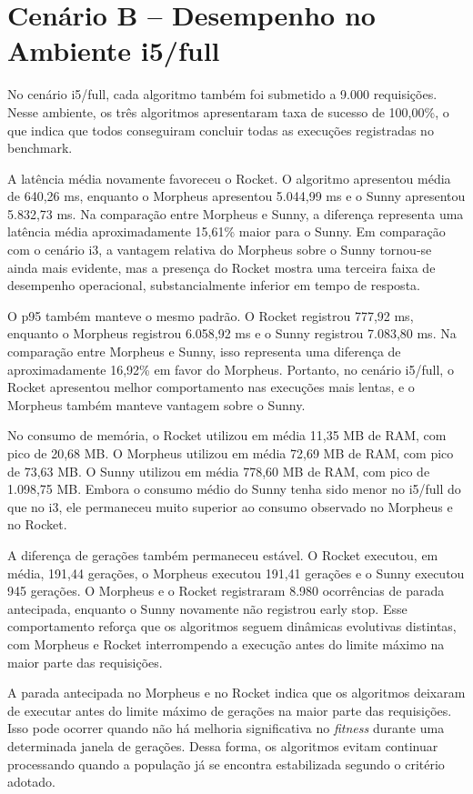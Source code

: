 \section{Cenário B -- Desempenho no Ambiente i5/full}
\label{sec:cenario-b-i5-full}

No cenário i5/full, cada algoritmo também foi submetido a 9.000 requisições. Nesse ambiente, os três algoritmos apresentaram taxa de sucesso de 100,00\%, o que indica que todos conseguiram concluir todas as execuções registradas no benchmark.

A latência média novamente favoreceu o Rocket. O algoritmo apresentou média de 640,26 ms, enquanto o Morpheus apresentou 5.044,99 ms e o Sunny apresentou 5.832,73 ms. Na comparação entre Morpheus e Sunny, a diferença representa uma latência média aproximadamente 15,61\% maior para o Sunny. Em comparação com o cenário i3, a vantagem relativa do Morpheus sobre o Sunny tornou-se ainda mais evidente, mas a presença do Rocket mostra uma terceira faixa de desempenho operacional, substancialmente inferior em tempo de resposta.

O p95 também manteve o mesmo padrão. O Rocket registrou 777,92 ms, enquanto o Morpheus registrou 6.058,92 ms e o Sunny registrou 7.083,80 ms. Na comparação entre Morpheus e Sunny, isso representa uma diferença de aproximadamente 16,92\% em favor do Morpheus. Portanto, no cenário i5/full, o Rocket apresentou melhor comportamento nas execuções mais lentas, e o Morpheus também manteve vantagem sobre o Sunny.

No consumo de memória, o Rocket utilizou em média 11,35 MB de RAM, com pico de 20,68 MB. O Morpheus utilizou em média 72,69 MB de RAM, com pico de 73,63 MB. O Sunny utilizou em média 778,60 MB de RAM, com pico de 1.098,75 MB. Embora o consumo médio do Sunny tenha sido menor no i5/full do que no i3, ele permaneceu muito superior ao consumo observado no Morpheus e no Rocket.

A diferença de gerações também permaneceu estável. O Rocket executou, em média, 191,44 gerações, o Morpheus executou 191,41 gerações e o Sunny executou 945 gerações. O Morpheus e o Rocket registraram 8.980 ocorrências de parada antecipada, enquanto o Sunny novamente não registrou early stop. Esse comportamento reforça que os algoritmos seguem dinâmicas evolutivas distintas, com Morpheus e Rocket interrompendo a execução antes do limite máximo na maior parte das requisições.

A parada antecipada no Morpheus e no Rocket indica que os algoritmos deixaram de executar antes do limite máximo de gerações na maior parte das requisições. Isso pode ocorrer quando não há melhoria significativa no \textit{fitness} durante uma determinada janela de gerações. Dessa forma, os algoritmos evitam continuar processando quando a população já se encontra estabilizada segundo o critério adotado.

